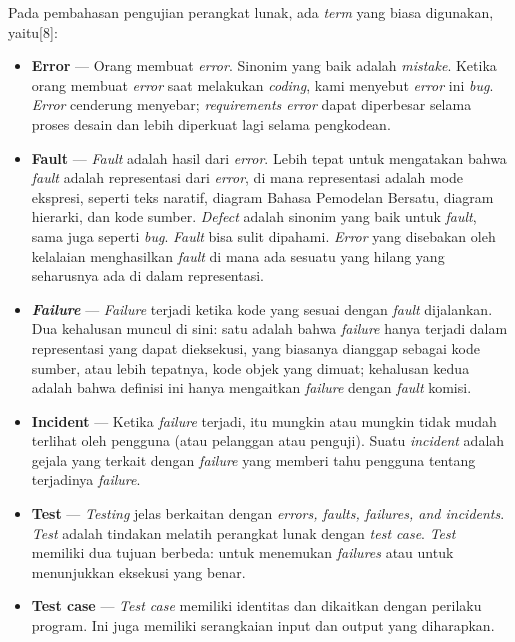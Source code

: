 Pada pembahasan pengujian perangkat lunak, ada \textit{term} yang biasa digunakan, yaitu[8]:
\begin{itemize}
\item \textbf{Error} --- Orang membuat \textit{error}. Sinonim yang baik adalah \textit{mistake}. Ketika orang membuat \textit{error} saat melakukan \textit{coding}, kami menyebut \textit{error} ini \textit{bug}. \textit{Error} cenderung menyebar; \textit{requirements error} dapat diperbesar selama proses desain dan lebih diperkuat lagi selama pengkodean.
\item \textbf{Fault} --- \textit{Fault} adalah hasil dari \textit{error}. Lebih tepat untuk mengatakan bahwa \textit{fault} adalah representasi dari \textit{error}, di mana representasi adalah mode ekspresi, seperti teks naratif, diagram Bahasa Pemodelan Bersatu, diagram hierarki, dan kode sumber. \textit{Defect} adalah sinonim yang baik untuk \textit{fault}, sama juga seperti \textit{bug}. \textit{Fault} bisa sulit dipahami. \textit{Error} yang disebakan oleh kelalaian menghasilkan \textit{fault} di mana ada sesuatu yang hilang yang seharusnya ada di dalam representasi.
\item \textit{\textbf{Failure}} --- \textit{Failure} terjadi ketika kode yang sesuai dengan \textit{fault} dijalankan. Dua kehalusan muncul di sini: satu adalah bahwa \textit{failure} hanya terjadi dalam representasi yang dapat dieksekusi, yang biasanya dianggap sebagai kode sumber, atau lebih tepatnya, kode objek yang dimuat; kehalusan kedua adalah bahwa definisi ini hanya mengaitkan \textit{failure} dengan \textit{fault} komisi.
\item \textbf{Incident} --- Ketika \textit{failure} terjadi, itu mungkin atau mungkin tidak mudah terlihat oleh pengguna (atau pelanggan atau penguji). Suatu \textit{incident} adalah gejala yang terkait dengan \textit{failure} yang memberi tahu pengguna tentang terjadinya \textit{failure}.
\item \textbf{Test} --- \textit{Testing} jelas berkaitan dengan  \textit{errors, faults, failures, and incidents}. \textit{Test} adalah tindakan melatih perangkat lunak dengan \textit{test case}. \textit{Test} memiliki dua tujuan berbeda: untuk menemukan \textit{failures} atau untuk menunjukkan eksekusi yang benar.
\item \textbf{Test case} --- \textit{Test case} memiliki identitas dan dikaitkan dengan perilaku program. Ini juga memiliki serangkaian input dan output yang diharapkan.
\end{itemize}


